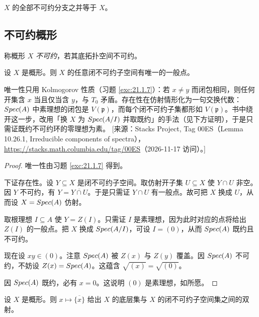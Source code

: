 \begin{exercise}\label{exc:21.2.3}
$X$ 的全部不可约分支之并等于 $X$。
\end{exercise}

\subsection{不可约概形}\label{sec:21.3}

\begin{definition}\label{def:21.3.1}
称概形 $X$ \emph{不可约}，若其底拓扑空间不可约。
\end{definition}

\begin{lemma}\label{lem:21.3.2}
设 $X$ 是概形。则 $X$ 的任意闭不可约子空间有唯一的一般点。
\end{lemma}

\begin{yizhu}
唯一性只用 Kolmogorov 性质（习题 \ref{exc:21.1.7}）：若 $x\ne y$ 而闭包相同，则任何开集含 $x$ 当且仅当含 $y$，与 $T_0$ 矛盾。存在性在仿射情形化为一句交换代数：$Spec(A)$ 中素理想的闭包是 $V(\mathfrak{p})$，而每个闭不可约子集都形如 $V(\mathfrak{p})$。书中绕开这一步，改用「换 $X$ 为 $Spec(A/I)$ 并取既约」的手法（见下方证明），于是只需证既约不可约环的零理想为素。
[来源：Stacks Project, Tag 00ES（Lemma 10.26.1, Irreducible components of spectra），\url{https://stacks.math.columbia.edu/tag/00ES}（2026-11-17 访问）。]
\end{yizhu}

\begin{proof}
唯一性由习题 \ref{exc:21.1.7} 得到。

下证存在性。设 $Y\subseteq X$ 是闭不可约子空间。取仿射开子集 $U\subseteq X$ 使 $Y\cap U$ 非空。因 $Y$ 不可约，有 $Y=\overline{Y\cap U}$。于是只需证 $Y\cap U$ 有一般点。故可把 $X$ 换成 $U$，从而设 $X=Spec(A)$ 仿射。

取根理想 $I\subseteq A$ 使 $Y=Z(I)$。只需证 $I$ 是素理想，因为此时对应的点将给出 $Z(I)$ 的一般点。把 $X$ 换成 $Spec(A/I)$，可设 $I=(0)$，从而 $Spec(A)$ 既约且不可约。

现在设 $xy\in(0)$。注意 $Spec(A)$ 被 $Z(x)$ 与 $Z(y)$ 覆盖。因 $Spec(A)$ 不可约，不妨设 $Z(x)=Spec(A)$。这蕴含 $\sqrt{(x)}=\sqrt{(0)}$。

因 $Spec(A)$ 既约，必有 $x=0$。这说明 $(0)$ 是素理想，如所愿。
\end{proof}

\begin{corollary}\label{cor:21.3.3}
设 $X$ 是概形。则 $x\mapsto\overline{\{x\}}$ 给出 $X$ 的底层集与 $X$ 的闭不可约子空间集之间的双射。
\end{corollary}

